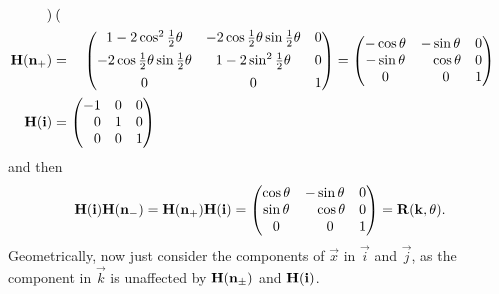 \documentclass[fleqn,a4paper,11pt]{article}
\begin{document}
\begin{enumerate}[label=\textbf{\arabic*.}]
\begin{enumerate}[label=(\alph*)]
\begin{alignat*}
\begin{pmatrix}
        \end{pmatrix} \\
       \mat H(\vec n_+)
        &={}&
        \begin{pmatrix}
         1 - 2\cos^2\tfrac 12\theta & -2 \cos\tfrac 12\theta\sin\tfrac 12\theta
          & 0 \\[1ex]
         -2 \cos\tfrac 12\theta\sin\tfrac 12\theta & 1 - 2\sin^2\tfrac 12\theta
          & 0 \\[1ex]
         0 & 0 & 1
        \end{pmatrix}
        &=
        \begin{pmatrix}
         -\cos\theta & -\sin\theta & 0 \\
         -\sin \theta & \phantom{-{}} \cos\theta & 0 \\
         0 & \phantom{-{}} 0 & 1
        \end{pmatrix} \\
       \mat H(\vec i)
        &=
        \mathrlap{
         \begin{pmatrix*}[r]
          -1 & 0 & 0 \\
          0 & 1 & 0 \\
          0 & 0 & 1
         \end{pmatrix*}
        }
      \end{alignat*}
      and then
      \begin{equation*}
       \mat H(\vec i) \mat H(\vec n_-) =
        \mat H(\vec n_+) \mat H(\vec i)
         =
         \begin{pmatrix}
          \cos\theta & -\sin\theta & 0 \\
          \sin\theta & \phantom{-{}} \cos\theta & 0 \\
          0 & \phantom{-{}} 0 & 1
         \end{pmatrix}
         = \mat R(\vec k, \theta).
      \end{equation*}
      Geometrically, now just consider the components of \(\vec x\)
      in \(\vec i\) and \(\vec j\), as the component in
      \(\vec k\) is unaffected by \(\mathbf{H}(\mathrm{\mathbf{n}}_\pm)\) and \(\mathbf{H}(\mathrm{\mathbf{i}})\).


\end{enumerate}
\end{enumerate}
\end{document}

